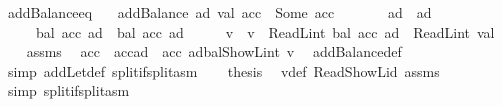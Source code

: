 \begin{isabellebody}
\isanewline
%
\endisadelimproof
\isanewline
{}\isamarkupfalse%
\ addBalance{\isacharunderscore}{\kern0pt}eq{\isacharcolon}{\kern0pt}\isanewline
\ \ \ {\isachardoublequoteopen}addBalance\ ad\ val\ acc\ {\isacharequal}{\kern0pt}\ Some\ acc{\isacharprime}{\kern0pt}{\isachardoublequoteclose}\isanewline
\ \ \ \ \ \ \ {\isachardoublequoteopen}ad\ {\isasymnoteq}\ ad{\isacharprime}{\kern0pt}{\isachardoublequoteclose}\isanewline
\ \ \ \ \ {\isachardoublequoteopen}bal\ {\isacharparenleft}{\kern0pt}acc\ ad{\isacharprime}{\kern0pt}{\isacharparenright}{\kern0pt}\ {\isacharequal}{\kern0pt}\ bal\ {\isacharparenleft}{\kern0pt}acc{\isacharprime}{\kern0pt}\ ad{\isacharprime}{\kern0pt}{\isacharparenright}{\kern0pt}{\isachardoublequoteclose}\isanewline
%
\isadelimproof
%
\endisadelimproof
%
\isatagproof
{}\isamarkupfalse%
\ {\isacharminus}{\kern0pt}\isanewline
\ \ \isamarkupfalse%
\ v\ \ {\isachardoublequoteopen}v\ {\isacharequal}{\kern0pt}\ ReadL\isactrlsub i\isactrlsub n\isactrlsub t\ {\isacharparenleft}{\kern0pt}bal\ {\isacharparenleft}{\kern0pt}acc\ ad{\isacharparenright}{\kern0pt}{\isacharparenright}{\kern0pt}\ {\isacharplus}{\kern0pt}\ ReadL\isactrlsub i\isactrlsub n\isactrlsub t\ val{\isachardoublequoteclose}\isanewline
\ \ \isamarkupfalse%
\ assms\ \isamarkupfalse%
\ {\isachardoublequoteopen}acc{\isacharprime}{\kern0pt}\ {\isacharequal}{\kern0pt}\ acc{\isacharparenleft}{\kern0pt}ad\ {\isacharcolon}{\kern0pt}{\isacharequal}{\kern0pt}\ acc\ ad{\isasymlparr}bal{\isacharcolon}{\kern0pt}{\isacharequal}{\kern0pt}ShowL\isactrlsub i\isactrlsub n\isactrlsub t\ v{\isasymrparr}{\isacharparenright}{\kern0pt}{\isachardoublequoteclose}\ \isamarkupfalse%
\ addBalance{\isacharunderscore}{\kern0pt}def\ \isamarkupfalse%
\ {\isacharparenleft}{\kern0pt}simp\ add{\isacharcolon}{\kern0pt}Let{\isacharunderscore}{\kern0pt}def\ split{\isacharcolon}{\kern0pt}if{\isacharunderscore}{\kern0pt}split{\isacharunderscore}{\kern0pt}asm{\isacharparenright}{\kern0pt}\isanewline
\ \ \isamarkupfalse%
\ {\isacharquery}{\kern0pt}thesis\ \isamarkupfalse%
\ v{\isacharunderscore}{\kern0pt}def\ Read{\isacharunderscore}{\kern0pt}ShowL{\isacharunderscore}{\kern0pt}id\ assms\ \isamarkupfalse%
\ {\isacharparenleft}{\kern0pt}simp\ split{\isacharcolon}{\kern0pt}if{\isacharunderscore}{\kern0pt}split{\isacharunderscore}{\kern0pt}asm{\isacharparenright}{\kern0pt}\isanewline
{}\isamarkupfalse%

\end{isabellebody}
